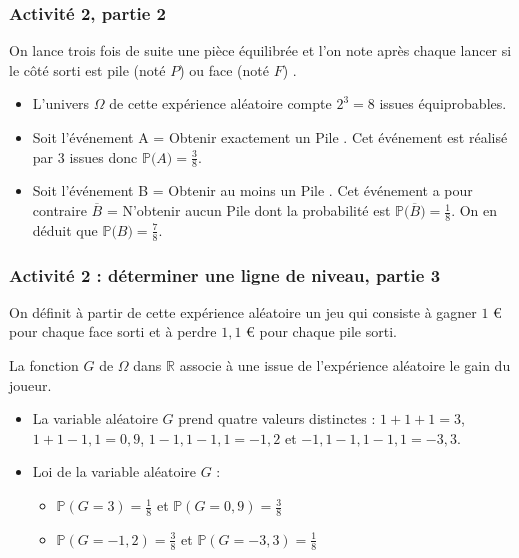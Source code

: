 \documentclass[11pt, hyperref={urlcolor=red,%
            linkcolor=blue, %
            colorlinks=true}]{beamer}
\newcommand{\R}{\mathbb{R}}
\newcommand{\proba}[1]{\mathbb{P}\big(#1\big)}
\begin{document}
\begin{frame}
\frametitle{Activité 2, partie 2}


On lance trois fois de suite une pièce équilibrée et l'on note après chaque lancer si le côté sorti est  pile (noté $P$) ou  face (noté $F$) .

\begin{itemize}
\pause \item L'univers $\Omega$ de cette expérience aléatoire compte $2^{3}=8$ issues équiprobables.
\pause \item Soit l'événement A = \og{} Obtenir exactement un Pile \fg{}. Cet événement est réalisé par $3$ issues donc $\proba{A}=\frac{3}{8}$.
\pause \item Soit l'événement B = \og{} Obtenir au moins un Pile \fg{}. Cet événement a pour contraire $\overline{B}$ = \og{} N'obtenir aucun Pile \fg{} dont la probabilité est  $\proba{\overline{B}}=\frac{1}{8}$. On en déduit que $\proba{B}=\frac{7}{8}$.

\end{itemize}  


\end{frame}


\begin{frame}
\frametitle{Activité 2 : déterminer une ligne de niveau, partie 3}


On définit à partir de  cette expérience aléatoire un jeu qui consiste  à gagner $1$ €  pour chaque face sorti  et à perdre $1,1$ € pour chaque pile sorti.

La fonction  $G$ de $\Omega$ dans $\R$ associe à une issue de l'expérience aléatoire  le gain du joueur.

\begin{itemize}
\pause \item La variable aléatoire $G$ prend quatre valeurs distinctes : $1+1+1=3$, $1+1-1,1=0,9$, $1-1,1-1,1=-1,2$ et $-1,1-1,1-1,1=-3,3$.
\pause \item Loi de la variable aléatoire $G$ :
  \begin{itemize}
\pause \item  $\mathbb{P}(G = 3)= \frac{1}{8}$ et  $\mathbb{P}(G = 0,9)= \frac{3}{8}$
 \pause \item  $\mathbb{P}(G = -1,2)= \frac{3}{8}$ et  $\mathbb{P}(G = -3,3)= \frac{1}{8}$
\end{itemize}  
\end{itemize} 

\end{frame}
\end{document}
